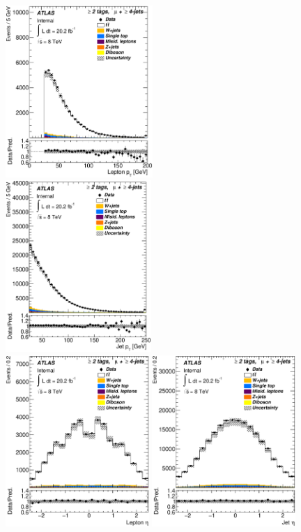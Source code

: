 \begin{figure}[!hb]
\begin{center}

		\includegraphics[height=65mm]{chapters/whel/figures/control_Plots2/bTag_2incl/LeptonPt_mu}
		\includegraphics[height=65mm]{chapters/whel/figures/control_Plots2/bTag_2incl/JetPt_mu}\\
		\includegraphics[height=65mm]{chapters/whel/figures/control_Plots2/bTag_2incl/LeptonEta_mu}
		\includegraphics[height=65mm]{chapters/whel/figures/control_Plots2/bTag_2incl/JetEta_mu}\\

\end{center}
\end{figure}
